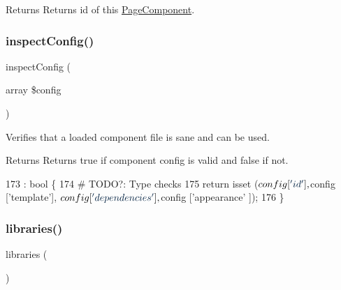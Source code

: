 \begin{DoxyReturn}{Returns}
Returns id of this \hyperlink{class_lora_1_1_page_component}{Page\+Component}. 
\end{DoxyReturn}

\mbox{\label{class_lora_1_1_page_component_a836e6e03df9ed37584042af4708928d6}} 
\subsubsection{\texorpdfstring{inspect\+Config()}{inspectConfig()}}
{\footnotesize\ttfamily inspect\+Config (\begin{DoxyParamCaption}\item[{array}]{\$config }\end{DoxyParamCaption})\hspace{0.3cm}{\ttfamily [private]}}

Verifies that a loaded component file is sane and can be used. \begin{DoxyReturn}{Returns}
Returns true if component config is valid and false if not. 
\end{DoxyReturn}

\begin{DoxyCode}
173                                                    : \textcolor{keywordtype}{bool} \{
174 \textcolor{preprocessor}{        # TODO?: Type checks}
175         \textcolor{keywordflow}{return} isset ($config [\textcolor{stringliteral}{'id'}], $config [\textcolor{stringliteral}{'template'}], $config [\textcolor{stringliteral}{'dependencies'}], $config [\textcolor{stringliteral}{'appearance'}
      ]);
176     \}
\end{DoxyCode}
\mbox{\label{class_lora_1_1_page_component_af34d5049c9cc4ab108d65218754b7429}} 
\subsubsection{\texorpdfstring{libraries()}{libraries()}}
{\footnotesize\ttfamily libraries (\begin{DoxyParamCaption}{ }\end{DoxyParamCaption})}

